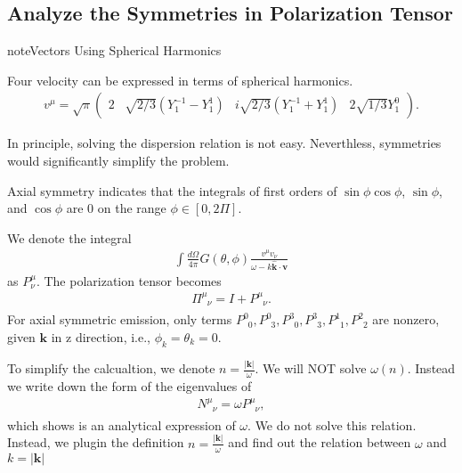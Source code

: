\documentclass[letterpaper,12pt,english]{sphinxmanual}
\begin{document}
\subsection{Analyze the Symmetries in Polarization Tensor}
\label{\detokenize{collective/dispersion-relation:analyze-the-symmetries-in-polarization-tensor}}
\begin{sphinxadmonition}{note}{Vectors Using Spherical Harmonics}

Four velocity can be expressed in terms of spherical harmonics.
\begin{equation*}
\begin{split}v^\mu = \sqrt{\pi}\begin{pmatrix} 2 & \sqrt{2/3} (Y_1^{-1} - Y_1^1) & i \sqrt{2/3} (Y_1^{-1} + Y_1^1) & 2\sqrt{1/3} Y_1^0 \end{pmatrix}.\end{split}
\end{equation*}\end{sphinxadmonition}

In principle, solving the dispersion relation is not easy. Neverthless, symmetries would significantly simplify the problem.

Axial symmetry indicates that the integrals of first orders of \(\sin\phi\cos\phi\), \(\sin\phi\), and \(\cos\phi\) are 0 on the range \(\phi\in [0,2\Pi]\).

We denote the integral
\begin{equation*}
\begin{split}\int \frac{d\Omega}{4\pi} G(\theta,\phi) \frac{v^\mu v_\nu}{\omega- k \hat{\mathbf k}\cdot \mathbf v}\end{split}
\end{equation*}
as \(P^\mu_\nu\). The polarization tensor becomes
\begin{equation*}
\begin{split}\Pi^\mu_{\phantom{\mu}\nu} = I + P^\mu_{\phantom{\mu}\nu}.\end{split}
\end{equation*}
For axial symmetric emission, only terms \(P^0_{\phantom{0}0}, P^0_{\phantom{0}3}, P^3_{\phantom{3}0}, P^3_{\phantom{3}3}, P^1_{\phantom{1}1}, P^2_{\phantom{2}2}\) are nonzero, given \(\mathbf k\) in z direction, i.e., \(\phi_k=\theta_k=0\).

To simplify the calcualtion, we denote \(n=\frac{\lvert \mathbf k\rvert}{\omega}\). We will NOT solve \(\omega(n)\). Instead we write down the form of the eigenvalues of
\begin{equation*}
\begin{split}N^\mu_{\phantom{\mu}\nu} = \omega P^\mu_{\phantom{\mu}\nu},\end{split}
\end{equation*}
which shows is an analytical expression of \(\omega\). We do not solve this relation. Instead, we plugin the definition \(n=\frac{\lvert \mathbf  k\rvert}{\omega}\) and find out the relation between \(\omega\) and \(k=\lvert \mathbf k \rvert\)
\end{document}
